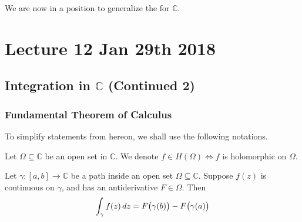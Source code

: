 \documentclass[11pt, oneside]{book}
\begin{document}
We are now in a position to generalize the  for $\mathbb{C}$.




\chapter{Lecture 12 Jan 29th 2018}
	\label{chapter:lecture_12_jan_29th_2018}

\section{Integration in \texorpdfstring{$\mathbb{C}$}{C} (Continued 2)} %
\label{sec:integration_in_c_continued_2}

\subsection{Fundamental Theorem of Calculus} %
\label{sub:fundamental_theorem_of_calculus}

To simplify statements from hereon, we shall use the following notations.

\begin{notation}
	Let $\Omega \subseteq \mathbb{C}$ be an open set in $\mathbb{C}$. We denote $f \in H(\Omega) \iff f $ is holomorphic on $\Omega$.
\end{notation}

\begin{thm}\label{thm:fundamental_theorem_of_calculus}
	Let $\gamma:[a,b] \to \mathbb{C}$ be a path inside an open set $\Omega \subseteq \mathbb{C}$. Suppose $f(z)$ is continuous on $\gamma$, and has an antiderivative $F \in \Omega$. Then
	\begin{equation}
		\label{eq:fundamental_theorem_of_calculus}
		\int_{\gamma} f(z) \mathop{}\!d{z} = F\big(\gamma(b)\big) - F\big(\gamma(a)\big)
	\end{equation}
\end{thm}
\end{document}
